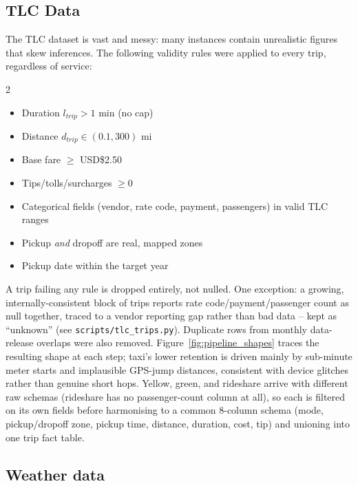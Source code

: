 \documentclass[11pt]{article}
\begin{document}
\subsection{TLC Data}

The TLC dataset is vast and messy: many instances contain unrealistic figures that skew inferences. The following validity rules were applied to every trip, regardless of service:

\begin{multicols}{2}
\begin{itemize}
    \item[$\thinstar$] Duration $l_{trip} > 1$ min (no cap)
    \item[$\thinstar$] Distance $d_{trip} \in (0.1, 300)$ mi
    \item[$\thinstar$] Base fare $\geq$ USD\$2.50
    \item[$\thinstar$] Tips/tolls/surcharges $\geq 0$
    \item[$\thinstar$] Categorical fields (vendor, rate code, payment, passengers) in valid TLC ranges
    \item[$\thinstar$] Pickup \emph{and} dropoff are real, mapped zones
    \item[$\thinstar$] Pickup date within the target year
\end{itemize}
\end{multicols}

A trip failing any rule is dropped entirely, not nulled. One exception: a growing, internally-consistent block of trips reports rate code/payment/passenger count as null together, traced to a vendor reporting gap rather than bad data -- kept as ``unknown'' (see \texttt{scripts/tlc\_trips.py}). Duplicate rows from monthly data-release overlaps were also removed. Figure~\ref{fig:pipeline_shapes} traces the resulting shape at each step; taxi's lower retention is driven mainly by sub-minute meter starts and implausible GPS-jump distances, consistent with device glitches rather than genuine short hops. Yellow, green, and rideshare arrive with different raw schemas (rideshare has no passenger-count column at all), so each is filtered on its own fields before harmonising to a common 8-column schema (mode, pickup/dropoff zone, pickup time, distance, duration, cost, tip) and unioning into one trip fact table.

\subsection{Weather data}
\end{document}
